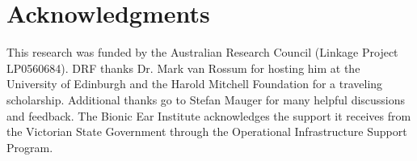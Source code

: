 \documentclass[a4paper]{IEEEtran}
\begin{document}
\section*{Acknowledgments}
This research was funded by the Australian Research Council (Linkage Project LP0560684). DRF thanks Dr. Mark van Rossum for hosting him at the University of Edinburgh and the Harold Mitchell Foundation for a traveling scholarship. Additional thanks go to Stefan Mauger for many helpful discussions and feedback. The Bionic Ear Institute acknowledges the support it receives from the Victorian State Government through the Operational Infrastructure Support Program. 







%

% 
% 
% 
% 
% 
% 

\end{document}
